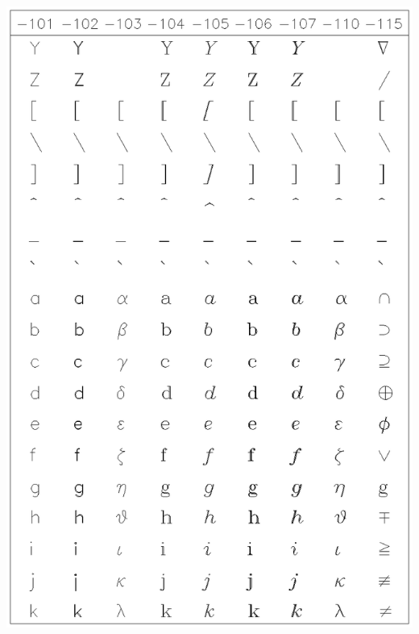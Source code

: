 \documentclass[11pt]{article}
\begin{document}
\includegraphics[height=0.95\textheight]{sun83-c4.eps}
\end{document}
